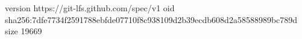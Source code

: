 version https://git-lfs.github.com/spec/v1
oid sha256:7dfe7734f2591788ebfde07710f8c938109d2b39ecdb608d2a58588989bc789d
size 19669
